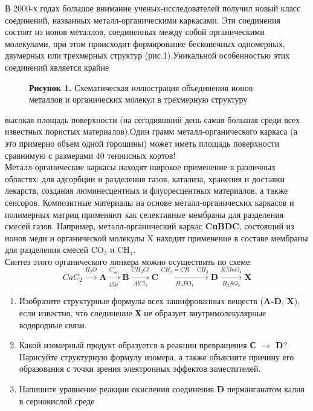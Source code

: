 В 2000-х годах большое внимание ученых-исследователей получил новый класс соединений, названных металл-органическими каркасами. Эти соединения состоят из ионов металлов, соединенных между собой органическими молекулами, при этом происходит формирование бесконечных одномерных, двумерных или трехмерных структур (рис.1).Уникальной особенностью этих соединений является крайне\begin{wrapfigure}{r}{4in}
\centering 
{}
\caption{\textbf{Рисунок 1.} Схематическая иллюстрация объединения ионов металлов и органических молекул в трехмерную структуру}
\end{wrapfigure}высокая площадь поверхности (на сегодняшний день самая большая среди всех известных пористых материалов).Один грамм металл-органического каркаса (а это примерно объем одной горошины) может иметь площадь поверхности сравнимую с размерами 40 теннисных кортов!\\

Металл-органические каркасы находят широкое применение в различных областях: для адсорбции и разделения газов, катализа, хранения и доставки лекарств, создания люминесцентных и флуоресцентных материалов, а также сенсоров. Композитные материалы на основе металл-органических каркасов и полимерных матриц применяют как селективные мембраны для разделения смесей газов. Например, металл-органический каркас \textbf{CuBDC}, состоящий из ионов меди и органической молекулы X находит применение в составе мембраны для разделения смесей CO$_2$ и CH$_4$.\\
Синтез этого органического линкера можно осуществить по схеме:
$$CaC_2\xrightarrow{H_2O}\textbf{A}\xrightarrow[450^{\circ}]{C_\text{акт}}\textbf{B}\xrightarrow[AlCl_3]{CH_3Cl}\textbf{C}\xrightarrow[H_3PO_4]{CH_2=CH-CH_3}\textbf{D}\xrightarrow[H_2SO_4]{KMnO_4}\textbf{X}$$
\begin{enumerate}
\item Изобразите структурные формулы всех зашифрованных веществ (\textbf{A-D}, \textbf{X}), если известно, что соединение \textbf{Х} не образует внутримолекулярные водородные связи.
\item Какой изомерный продукт образуется в реакции превращения \textbf{С $\rightarrow$ D}? Нарисуйте структурную формулу изомера, а также объясните причину его образования с точки зрения электронных эффектов заместителей.
\item Напишите уравнение реакции окисления соединения \textbf{D} перманганатом калия в сернокислой среде
\end{enumerate}
